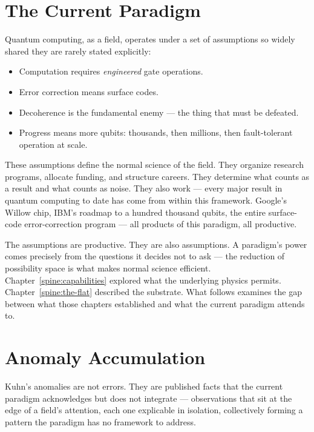 \section*{The Current Paradigm}
\label{spine:sr-current-paradigm}

Quantum computing, as a field, operates under a set of assumptions so widely shared they are rarely stated explicitly:

\begin{itemize}
\item Computation requires \emph{engineered} gate operations.
\item Error correction means surface codes.
\item Decoherence is the fundamental enemy --- the thing that must be defeated.
\item Progress means more qubits: thousands, then millions, then fault-tolerant operation at scale.
\end{itemize}

These assumptions define the normal science of the field. They organize research programs, allocate funding, and structure careers. They determine what counts as a result and what counts as noise. They also work --- every major result in quantum computing to date has come from within this framework. Google's Willow chip, IBM's roadmap to a hundred thousand qubits, the entire surface-code error-correction program --- all products of this paradigm, all productive.

The assumptions are productive. They are also assumptions. A paradigm's power comes precisely from the questions it decides not to ask --- the reduction of possibility space is what makes normal science efficient. Chapter~\ref{spine:capabilities} explored what the underlying physics permits. Chapter~\ref{spine:the-flat} described the substrate. What follows examines the gap between what those chapters established and what the current paradigm attends to.

\section*{Anomaly Accumulation}
\label{spine:sr-anomaly-accumulation}

Kuhn's anomalies are not errors. They are published facts that the current paradigm acknowledges but does not integrate --- observations that sit at the edge of a field's attention, each one explicable in isolation, collectively forming a pattern the paradigm has no framework to address.

